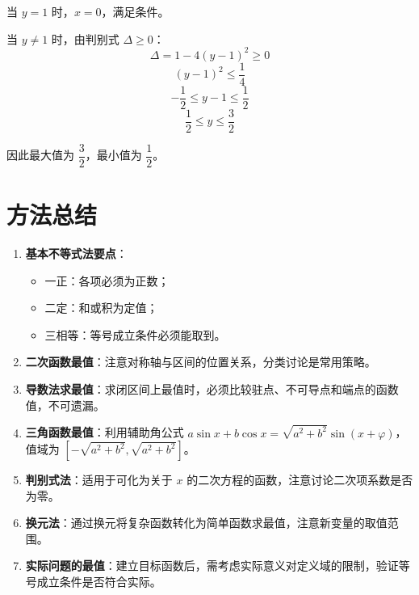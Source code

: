 \documentclass[11pt]{ctexrep}
\begin{document}
当 $y = 1$ 时，$x = 0$，满足条件。

当 $y \neq 1$ 时，由判别式 $\Delta \geq 0$：
\[
    \Delta = 1 - 4(y-1)^2 \geq 0
\]
\[
    (y-1)^2 \leq \frac{1}{4}
\]
\[
    -\frac{1}{2} \leq y-1 \leq \frac{1}{2}
\]
\[
    \frac{1}{2} \leq y \leq \frac{3}{2}
\]

因此最大值为 $\dfrac{3}{2}$，最小值为 $\dfrac{1}{2}$。

\section*{方法总结}

\begin{enumerate}
    \item \textbf{基本不等式法要点}：
    \begin{itemize}
        \item 一正：各项必须为正数；
        \item 二定：和或积为定值；
        \item 三相等：等号成立条件必须能取到。
    \end{itemize}
    \item \textbf{二次函数最值}：注意对称轴与区间的位置关系，分类讨论是常用策略。
    \item \textbf{导数法求最值}：求闭区间上最值时，必须比较驻点、不可导点和端点的函数值，不可遗漏。
    \item \textbf{三角函数最值}：利用辅助角公式 $a\sin x + b\cos x = \sqrt{a^2+b^2}\sin(x+\varphi)$，值域为 $[-\sqrt{a^2+b^2}, \sqrt{a^2+b^2}]$。
    \item \textbf{判别式法}：适用于可化为关于 $x$ 的二次方程的函数，注意讨论二次项系数是否为零。
    \item \textbf{换元法}：通过换元将复杂函数转化为简单函数求最值，注意新变量的取值范围。
    \item \textbf{实际问题的最值}：建立目标函数后，需考虑实际意义对定义域的限制，验证等号成立条件是否符合实际。
\end{enumerate}
\end{document}
